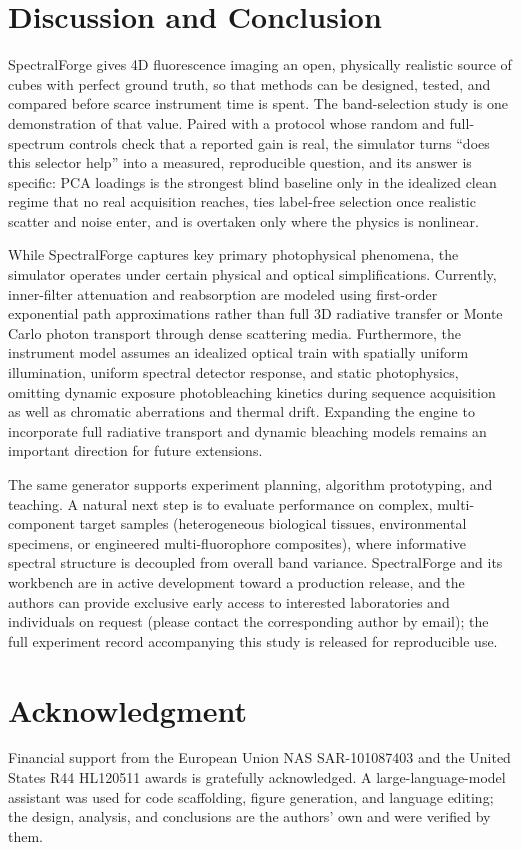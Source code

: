 \documentclass[conference]{IEEEtran}
\begin{document}
\section{Discussion and Conclusion}
SpectralForge gives 4D fluorescence imaging an open, physically realistic source of cubes
with perfect ground truth, so that methods can be designed, tested, and compared
before scarce instrument time is spent. The band-selection study is one demonstration of
that value. Paired with a protocol whose random and full-spectrum controls check that a
reported gain is real, the simulator turns ``does this selector help'' into a measured,
reproducible question, and its answer is specific: PCA loadings is the strongest blind
baseline only in the idealized clean regime that no real acquisition reaches, ties
label-free selection once realistic scatter and noise enter, and is overtaken only where
the physics is nonlinear.

While SpectralForge captures key primary photophysical phenomena, the simulator operates
under certain physical and optical simplifications. Currently, inner-filter attenuation and
reabsorption are modeled using first-order exponential path approximations rather than full
3D radiative transfer or Monte Carlo photon transport through dense scattering media.
Furthermore, the instrument model assumes an idealized optical train with spatially uniform
illumination, uniform spectral detector response, and static photophysics, omitting dynamic
exposure photobleaching kinetics during sequence acquisition as well as chromatic
aberrations and thermal drift. Expanding the engine to incorporate full radiative transport
and dynamic bleaching models remains an important direction for future extensions.

The same generator supports experiment planning, algorithm prototyping, and teaching. A
natural next step is to evaluate performance on complex, multi-component target samples
(heterogeneous biological tissues, environmental specimens, or engineered multi-fluorophore
composites), where informative spectral structure is decoupled from overall band variance.
SpectralForge and its workbench are in active development toward a production release, and
the authors can provide exclusive early access to interested laboratories and individuals
on request (please contact the corresponding author by email); the full experiment record
accompanying this study is released for reproducible use.

\section*{Acknowledgment}
Financial support from the European Union NAS SAR-101087403 and the United States
R44 HL120511 awards is gratefully acknowledged. A large-language-model assistant was
used for code scaffolding, figure generation, and language editing; the design,
analysis, and conclusions are the authors' own and were verified by them.
\end{document}
